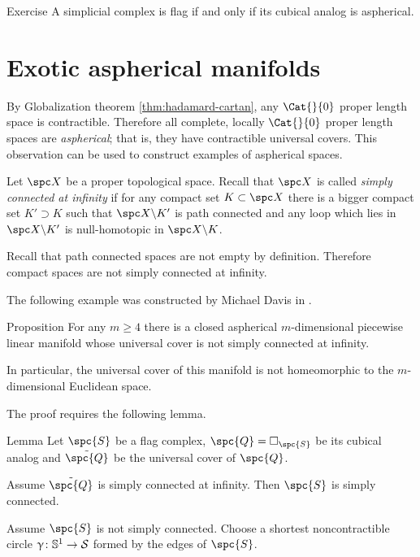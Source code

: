 \begin{thm}{Exercise}\label{ex:flag-aspherical}
A simplicial complex is flag 
if and only if its cubical analog is aspherical.
\end{thm}

\section{Exotic aspherical manifolds}


By Globalization theorem \ref{thm:hadamard-cartan},
any $\Cat{}{0}$ proper length space is contractible.
Therefore all complete, locally $\Cat{}{0}$ proper length spaces 
are \emph{aspherical};
that is, they have contractible universal covers.
This observation can be used to construct examples of aspherical spaces. 

Let $\spc X$ be a proper topological space.
Recall that $\spc X$ is called 
\emph{simply connected at infinity} 
if for any compact set $K\subset\spc X$
there is a bigger compact set $K'\supset K$
such that  $\spc X\backslash K'$ is path connected 
and any loop which lies in $\spc X\backslash K'$
is null-homotopic in  $\spc X\backslash K$.

Recall that path connected spaces are not empty by definition.
Therefore compact spaces are not simply connected at infinity.

The following example was constructed by Michael 
Davis in \cite{davis-noneuclidean}.

\begin{thm}{Proposition}\label{prop:aspherical}
For any  $m\ge 4$ there is a closed aspherical 
$m$-dimensional piecewise linear manifold
whose universal cover is not simply connected at infinity.

In particular, the universal cover of this manifold 
is not homeomorphic to the $m$-dimensional Euclidean space.
\end{thm}

The proof requires the following lemma.

\begin{thm}{Lemma}\label{lem:example-pi_infty}
Let $\spc{S}$ be a flag complex,
$\spc{Q}=\square_{\spc{S}}$ be its cubical analog
and $\tilde{\spc{Q}}$ be the universal cover of $\spc{Q}$.

Assume  $\tilde{\spc{Q}}$ is simply connected at infinity.
Then $\spc{S}$ is simply connected.
\end{thm}

Assume $\spc{S}$ is not simply connected.
Choose a shortest noncontractible circle $\gamma\:\mathbb{S}^1\to\spc{S}$ formed by the edges of $\spc{S}$.

